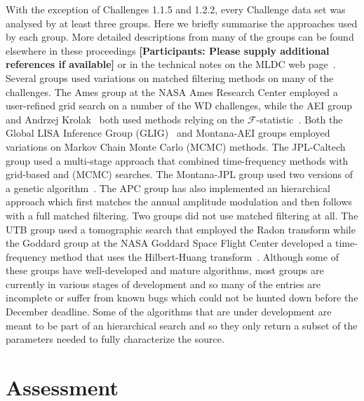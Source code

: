 \documentclass[12pt]{iopart}
\begin{document}
With the exception of Challenges 1.1.5 and 1.2.2, every Challenge data set was analysed by at least three groups. Here we briefly summarise the approaches used by each group. More detailed descriptions from many of the groups can be found elsewhere in these proceedings {\bf [Participants: Please supply additional references if available]} or in the technical notes on the MLDC web page~\cite{MLDCweb}. Several groups used variations on matched filtering methods on many of the challenges. The Ames group at the NASA Ames Research Center employed a user-refined grid search on a number of the WD challenges, while the AEI group and Andrzej Krolak~\cite{krolak04} both used methods relying on the $\mathcal{F}$-statistic~\cite{jaranowski98}. Both the Global LISA Inference Group (GLIG)~\cite{stroeer06,umstatter05,wickham06} and Montana-AEI groups employed variations on Markov Chain Monte Carlo (MCMC) methods. The JPL-Caltech group used a multi-stage approach that combined time-frequency methods with grid-based and (MCMC) searches. The Montana-JPL group used two versions of a genetic algorithm~\cite{crowder06a,crowder06b}. The APC group has also implemented an hierarchical approach which first matches the annual amplitude modulation and then follows with a full matched filtering. Two groups did not use matched filtering at all. The UTB group used a tomographic search that employed the Radon transform while the Goddard group at the NASA Goddard Space Flight Center developed a time-frequency method that uses the Hilbert-Huang transform~\cite{huang98}. Although some of these groups have well-developed and mature algorithms, most groups are currently in various stages of development and so many of the entries are incomplete or suffer from known bugs which could not be hunted down before the December deadline. Some of the algorithms that are under development are meant to be part of an hierarchical search and so they only return a subset of the parameters needed to fully characterize the source.

\section{Assessment}
\end{document}
